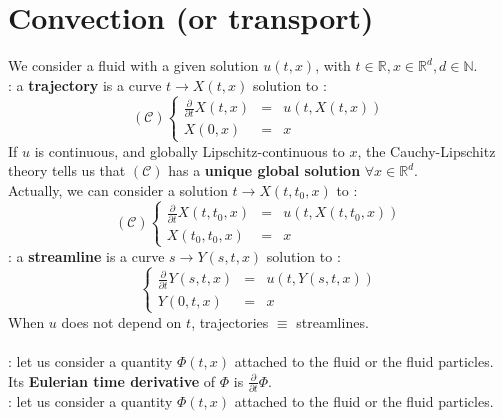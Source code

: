 \documentclass{report}
\newcommand*{\definition}[1]{\noindent\textbf{\color{cadmiumgreen}{#1}}}
\theoremstyle{plain}
\theoremstyle{definition}
\theoremstyle{remark}
\begin{document}
\section{Convection (or transport)}
We consider a fluid with a given solution $u(t,x)$, with $t \in \mathbb{R}, x \in \mathbb{R}^d, d \in \mathbb{N}$. \\
\definition{Trajectory} : a \textbf{trajectory} is a curve $t \rightarrow X(t,x)$ solution to :
\begin{equation}
	\mathcal{(C)}
	\left\lbrace
	\begin{array}{lclc}
	\frac{\partial}{\partial t}X(t,x) &=& u(t,X(t,x)) \\
	X(0,x) &=& x
	\end{array}
    \right.
\end{equation}
If $u$ is continuous, and globally Lipschitz-continuous to $x$, the Cauchy-Lipschitz theory tells us that $(\mathcal{C})$ has a \textbf{unique global solution} $\forall x \in \mathbb{R}^d$. \\
Actually, we can consider a solution $t \rightarrow X(t,t_0,x)$ to : 
\begin{equation}
	\mathcal{(C)}
	\left\lbrace
	\begin{array}{lclc}
	\frac{\partial}{\partial t}X(t,t_0,x) &=& u(t,X(t,t_0,x)) \\
	X(t_0,t_0,x) &=& x
	\end{array}
    \right.
\end{equation}
\definition{Streamline} : a \textbf{streamline} is a curve $s \rightarrow Y(s,t,x)$ solution to :
\begin{equation}
	\left\lbrace
	\begin{array}{lclc}
	\frac{\partial}{\partial t}Y(s,t,x) &=& u(t,Y(s,t,x)) \\
	Y(0,t,x) &=& x
	\end{array}
    \right.
\end{equation}
When $u$ does not depend on $t$, trajectories $\equiv$ streamlines.\\ \\
\definition{Eulerian time derivative} : let us consider a quantity $\Phi(t,x)$ attached to the fluid or the fluid particles.\\ 
Its \textbf{Eulerian time derivative} of $\Phi$ is $\frac{\partial}{\partial t}\Phi$. \\
\definition{Lagrangian time derivative} : let us consider a quantity $\Phi(t,x)$ attached to the fluid or the fluid particles.\\ 
\end{document}
